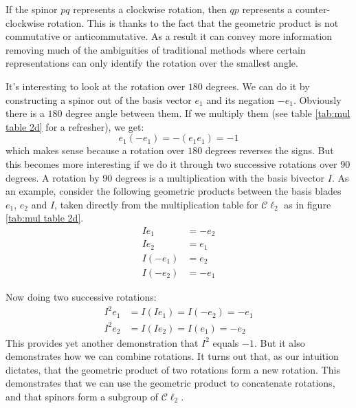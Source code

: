 \documentclass[10pt]{report}
\begin{document}
If the spinor $pq$ represents a clockwise rotation, then $qp$
represents a counter-clockwise rotation. This is thanks to the
fact that the geometric product is not commutative or
anticommutative. As a result it can convey more information
removing much of the ambiguities of traditional methods where
certain representations can only identify the rotation over the
smallest angle.

It's interesting to look at the rotation over $180$ degrees. We
can do it by constructing a spinor out of the basis vector $e_1$
and its negation $-e_1$. Obviously there is a $180$ degree angle
between them. If we multiply them (see table \ref{tab:mul table
2d} for a refresher), we get:
\begin{displaymath}
    e_1(-e_1) = -(e_1e_1) = -1
\end{displaymath}
which makes sense because a rotation over $180$ degrees reverses
the signs. But this becomes more interesting if we do it through
two successive rotations over $90$ degrees. A rotation by 90
degrees is a multiplication with the basis bivector $I$. As an
example, consider the following geometric products between the
basis blades $e_1$, $e_2$ and $I$, taken directly from the
multiplication table for $\mathcal{C}\ell_2$ as in figure
\ref{tab:mul table 2d}.
\begin{align}
     Ie_1   &= -e_2       \nonumber \\
     Ie_2   &=  e_1       \nonumber \\
    I(-e_1) &=  e_2       \nonumber \\
    I(-e_2) &= -e_1       \nonumber
\end{align}

Now doing two successive rotations:
\begin{align*}
    I^2e_1 &= I(Ie_1) = I(-e_2) = -e_1   \\
    I^2e_2 &= I(Ie_2) = I(e_1) = -e_2
\end{align*}
This provides yet another demonstration that $I^2$ equals $-1$.
But it also demonstrates how we can combine rotations. It turns
out that, as our intuition dictates, that the geometric product of
two rotations form a new rotation. This demonstrates that we can
use the geometric product to concatenate rotations, and that
spinors form a subgroup of $\mathcal{C}\ell_2$.
\end{document}

